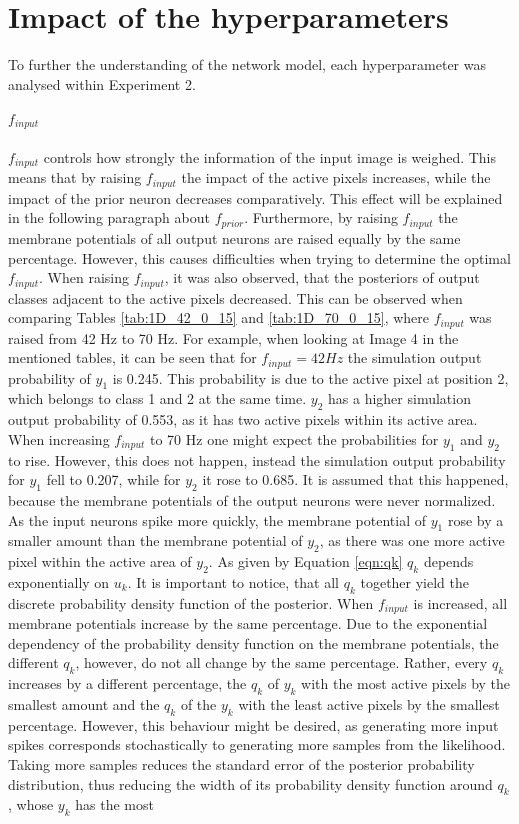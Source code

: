 \section{Impact of the hyperparameters}
\label{section:impactHyper}

To further the understanding of the network model, each hyperparameter was analysed within Experiment 2.

\paragraph{$f_{input}$} $f_{input}$ controls how strongly the information of the input image is weighed. This means that by raising $f_{input}$ the impact of the active pixels increases, while the impact of the prior neuron decreases comparatively. This effect will be explained in the following paragraph about $f_{prior}$. Furthermore, by raising $f_{input}$ the membrane potentials of all output neurons are raised equally by the same percentage. However, this causes difficulties when trying to determine the optimal $f_{input}$. When raising $f_{input}$, it was also observed, that the posteriors of output classes adjacent to the active pixels decreased. This can be observed when comparing Tables \ref{tab:1D_42_0_15} and \ref{tab:1D_70_0_15}, where $f_{input}$ was raised from 42 Hz to 70 Hz. For example, when looking at Image 4 in the mentioned tables, it can be seen that for $f_{input} = 42 Hz$ the simulation output probability of $y_1$ is 0.245. This probability is due to the active pixel at position 2, which belongs to class 1 and 2 at the same time. $y_2$ has a higher simulation output probability of 0.553, as it has two active pixels within its active area. When increasing $f_{input}$ to 70 Hz one might expect the probabilities for $y_1$ and $y_2$ to rise. However, this does not happen, instead the simulation output probability for $y_1$ fell to 0.207, while for $y_2$ it rose to 0.685. It is assumed that this happened, because the membrane potentials of the output neurons were never normalized. As the input neurons spike more quickly, the membrane potential of $y_1$ rose by a smaller amount than the membrane potential of $y_2$, as there was one more active pixel within the active area of $y_2$. As given by Equation \ref{eqn:qk} $q_k$ depends exponentially on $u_k$. It is important to notice, that all $q_k$ together yield the discrete probability density function of the posterior. When $f_{input}$ is increased, all membrane potentials increase by the same percentage. Due to the exponential dependency of the probability density function on the membrane potentials, the different $q_k$, however, do not all change by the same percentage. Rather, every $q_k$ increases by a different percentage, the $q_k$ of $y_k$ with the most active pixels by the smallest amount and the $q_k$ of the $y_k$ with the least active pixels by the smallest percentage. However, this behaviour might be desired, as generating more input spikes corresponds stochastically to generating more samples from the likelihood. Taking more samples reduces the standard error of the posterior probability distribution, thus reducing the width of its probability density function around $q_k$, whose $y_k$ has the most 